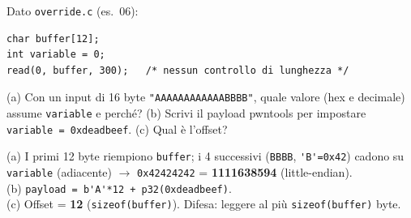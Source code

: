 \question[6]
Dato \lstinline|override.c| (es.\ 06):
\begin{lstlisting}[style=c]
char buffer[12];
int variable = 0;
read(0, buffer, 300);   /* nessun controllo di lunghezza */
\end{lstlisting}
(a) Con un input di 16 byte \lstinline|"AAAAAAAAAAAABBBB"|, quale valore (hex e decimale) assume \lstinline|variable| e perché?
(b) Scrivi il payload pwntools per impostare \lstinline|variable = 0xdeadbeef|. (c) Qual è l'offset?
\begin{solution}
(a) I primi 12 byte riempiono \lstinline|buffer|; i 4 successivi (\lstinline|BBBB|, \lstinline|'B'=0x42|) cadono su \lstinline|variable| (adiacente) $\to$ \lstinline|0x42424242| = \textbf{1111638594} (little-endian).\\
(b) \lstinline|payload = b'A'*12 + p32(0xdeadbeef)|.\\
(c) Offset = \textbf{12} (\lstinline|sizeof(buffer)|). Difesa: leggere al più \lstinline|sizeof(buffer)| byte.
\end{solution}
